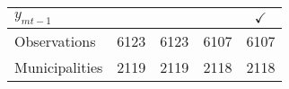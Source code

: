 \begin{tabular}{lcccc}
\textit{$y_{mt-1}$}  				& 				&   
												& 
												& 
								$\checkmark$	\\



\midrule		


Observations 			&	 6123   &   
							 6123   & 
							 6107   & 
							 6107   \\

Municipalities  		&    2119   &   
							 2119   & 
							 2118   & 
							 2118   \\

\bottomrule

\end{tabular}%
